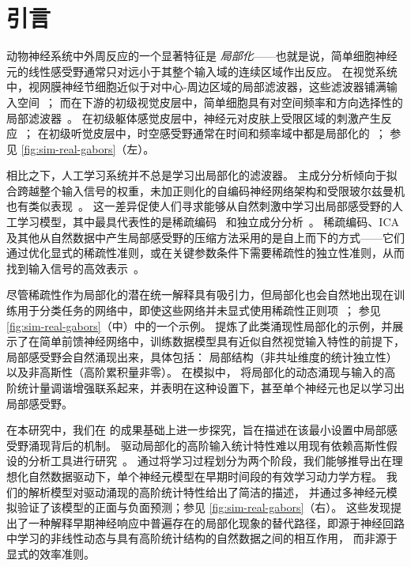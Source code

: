 \section{引言}
\label{sec:introduction}

动物神经系统中外周反应的一个显著特征是 \emph{局部化}——也就是说，简单细胞神经元的线性感受野通常只对远小于其整个输入域的连续区域作出反应。
在视觉系统中，视网膜神经节细胞近似于对中心-周边区域的局部滤波器，这些滤波器铺满输入空间~\parencite{dacey2000center,doi2012efficient,knudsen1978space}；
而在下游的初级视觉皮层中，简单细胞具有对空间频率和方向选择性的局部滤波器~\parencite{hubel1959receptive,hubel1968receptive,rolls1995sparseness,niell2008highly,willmore2011sparse,ringach2002orientation,ringach2002spatial}。
在初级躯体感觉皮层中，神经元对皮肤上受限区域的刺激产生反应~\parencite{crochet2011synaptic}；
在初级听觉皮层中，时空感受野通常在时间和频率域中都是局部化的~\parencite{deweese2003binary,hromadka2008sparse}；
参见 \cref{fig:sim-real-gabors}（左）。

相比之下，人工学习系统并不总是学习出局部化的滤波器。
主成分分析倾向于拟合跨越整个输入信号的权重，未加正则化的自编码神经网络架构和受限玻尔兹曼机也有类似表现~\parencite{saxe2011unsupervised}。
这一差异促使人们寻求能够从自然刺激中学习出局部感受野的人工学习模型，其中最具代表性的是稀疏编码~\parencite{olshausen1996emergence,olshausen1997sparse} 和独立成分分析~\parencite[ICA;~][]{bell1997independent,vanhateren1998independent}。
稀疏编码、ICA 及其他从自然数据中产生局部感受野的压缩方法采用的是自上而下的方式——它们通过优化显式的稀疏性准则，或在关键参数条件下需要稀疏性的独立性准则，从而找到输入信号的高效表示~\cite{field1999wavelets,saxe2011unsupervised}。

尽管稀疏性作为局部化的潜在统一解释具有吸引力，但局部化也会自然地出现在训练用于分类任务的网络中，即使这些网络并未显式使用稀疏性正则项~\parencite{krizhevsky2012imagenet,zeiler2013visualizing,yosinski2015understanding,sengupta2018manifoldtiling}；
参见 \cref{fig:sim-real-gabors}（中）中的一个示例。
\textcite{ingrosso2022data} 提炼了此类涌现性局部化的示例，并展示了在简单前馈神经网络中，训练数据模型具有近似自然视觉输入特性的前提下，局部感受野会自然涌现出来，具体包括：
局部结构（非共址维度的统计独立性）以及非高斯性（高阶累积量非零）。
在模拟中，\textcite{ingrosso2022data} 将局部化的动态涌现与输入的高阶统计量调谐增强联系起来，并表明在这种设置下，甚至单个神经元也足以学习出局部感受野。

在本研究中，我们在 \textcite{ingrosso2022data} 的成果基础上进一步探究，旨在描述在该最小设置中局部感受野涌现背后的机制。
驱动局部化的高阶输入统计特性难以用现有依赖高斯性假设的分析工具进行研究~\parencite{goldt2020modelling}。
通过将学习过程划分为两个阶段，我们能够推导出在理想化自然数据驱动下，单个神经元模型在早期时间段的有效学习动力学方程。
我们的解析模型对驱动涌现的高阶统计特性给出了简洁的描述，
并通过多神经元模拟验证了该模型的正面与负面预测；参见 \cref{fig:sim-real-gabors}（右）。
这些发现提出了一种解释早期神经响应中普遍存在的局部化现象的替代路径，即源于神经回路中学习的非线性动态与具有高阶统计结构的自然数据之间的相互作用，
而非源于显式的效率准则。

